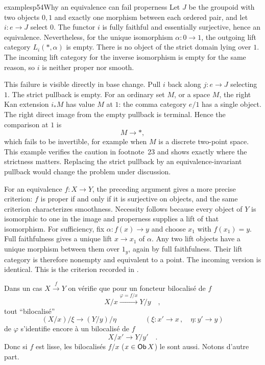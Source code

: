 \begin{dcomment}{examples}{p54}{Why an equivalence can fail properness}
Let $J$ be the groupoid with two objects $0,1$ and exactly one morphism between each ordered pair, and let $i:e\to J$ select $0$. The functor $i$ is fully faithful and essentially surjective, hence an equivalence. Nevertheless, for the unique isomorphism $\alpha:0\to1$, the outgoing lift category $L_i(*,\alpha)$ is empty. There is no object of the strict domain lying over $1$. The incoming lift category for the inverse isomorphism is empty for the same reason, so $i$ is neither proper nor smooth.

This failure is visible directly in base change. Pull $i$ back along $j:e\to J$ selecting $1$. The strict pullback is empty. For an ordinary set $M$, or a space $M$, the right Kan extension $i_*M$ has value $M$ at $1$: the comma category $e/1$ has a single object. The right direct image from the empty pullback is terminal. Hence the comparison at $1$ is
\[
 M\longrightarrow *,
\]
which fails to be invertible, for example when $M$ is a discrete two-point space. This example verifies the caution in footnote~23 and shows exactly where the strictness matters. Replacing the strict pullback by an equivalence-invariant pullback would change the problem under discussion.

For an equivalence $f:X\to Y$, the preceding argument gives a more precise criterion: $f$ is proper if and only if it is surjective on objects, and the same criterion characterizes smoothness. Necessity follows because every object of $Y$ is isomorphic to one in the image and properness supplies a lift of that isomorphism. For sufficiency, fix $\alpha:f(x)\to y$ and choose $x_1$ with $f(x_1)=y$. Full faithfulness gives a unique lift $x\to x_1$ of $\alpha$. Any two lift objects have a unique morphism between them over $1_y$, again by full faithfulness. Their lift category is therefore nonempty and equivalent to a point. The incoming version is identical. This is the criterion recorded in \citet[Remark~3.2.5]{Maltsiniotis2020}.
\end{dcomment}


Dans un cas $X \xrightarrow{f} Y$ on vérifie que pour un foncteur bilocalisé de $f$
\[
X/x \xrightarrow{\varphi=f/x} Y/y \quad ,
\]
tout ``bilocalisé''
\[
(X/x)/\xi \longrightarrow (Y/y)/\eta \qquad\qquad (\xi : x' \to x\,, \quad \eta : y' \to y)
\]
de $\varphi$ s'identifie encore à un bilocalisé de $f$
\[
X/x' \longrightarrow Y/y' \quad .
\]
Donc si $f$ est lisse, les bilocalisés $f/x$ ($x \in \mathsf{Ob}\, X$) le sont aussi. Notons d'autre part.

